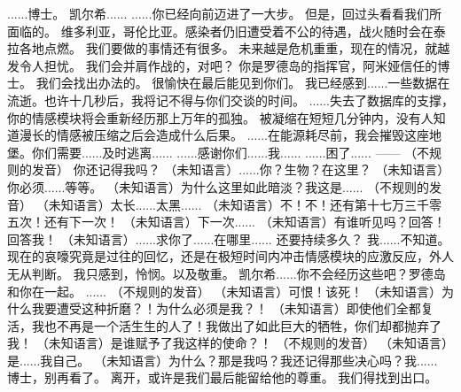 \documentclass[openany]{book}
\begin{document}
\begin{dialogue}
     ......博士。
     凯尔希......
     ......你已经向前迈进了一大步。
     但是，回过头看看我们所面临的。
     维多利亚，哥伦比亚。感染者仍旧遭受着不公的待遇，战火随时会在泰拉各地点燃。
     我们要做的事情还有很多。
     未来越是危机重重，现在的情况，就越发令人担忧。
     我们会并肩作战的，对吧？
     你是罗德岛的指挥官，阿米娅信任的博士。
     我们会找出办法的。
     很愉快在最后能见到你们。
     我已经感到......一些数据在流逝。也许十几秒后，我将记不得与你们交谈的时间。
     ......失去了数据库的支撑，你的情感模块将会重新经历那上万年的孤独。
     被凝缩在短短几分钟内，没有人知道漫长的情感被压缩之后会造成什么后果。
     ......在能源耗尽前，我会摧毁这座地堡。你们需要......及时逃离......
     ......感谢你们......我......
     ......困了......
     ——
     （不规则的发音）
     你还记得我吗？
     （未知语言）......你？生物？在这里？
     （未知语言）你必须......等等。
     （未知语言）为什么这里如此暗淡？我这是......
     （不规则的发音）
     （未知语言）太长......太黑......
     （未知语言）不！不！还有第十七万三千零五次！还有下一次！
     （未知语言）下一次......
     （未知语言）有谁听见吗？回答！回答我！
     （未知语言）......求你了......在哪里......
     还要持续多久？
     我......不知道。
     现在的哀嚎究竟是过往的回忆，还是在极短时间内冲击情感模块的应激反应，外人无从判断。
     我只感到，怜悯。以及敬重。
     凯尔希......你不会经历这些吧？罗德岛和你在一起。
     ......
     （不规则的发音）
     （未知语言）可恨！该死！
     （未知语言）为什么我要遭受这种折磨？！为什么必须是我？！
     （未知语言）即使他们全都复活，我也不再是一个活生生的人了！我做出了如此巨大的牺牲，你们却都抛弃了我！
     （未知语言）是谁赋予了我这样的使命？！
     （不规则的发音）
     （未知语言）是......我自己。
     （未知语言）为什么？那是我吗？我还记得那些决心吗？我......
     博士，别再看了。
     离开，或许是我们最后能留给他的尊重。
     我们得找到出口。
\end{dialogue}
\end{document}
